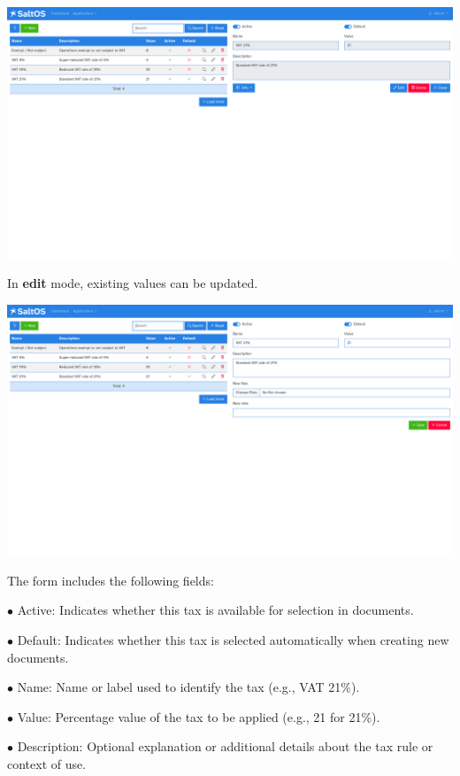 \documentclass[a4paper]{article}
\begin{document}
\begin{center}\includegraphics[width=1\textwidth]{../ujest/snaps/test-screenshots-js-screenshots-sales-taxes-view-1-en-us-1-snap.png}\end{center}

In \textbf{edit} mode, existing values can be updated.

\begin{center}\includegraphics[width=1\textwidth]{../ujest/snaps/test-screenshots-js-screenshots-sales-taxes-edit-1-en-us-1-snap.png}\end{center}

The form includes the following fields:

\begin{compactitem}
\item[\color{myblue}$\bullet$] Active: Indicates whether this tax is available for selection in documents.
\item[\color{myblue}$\bullet$] Default: Indicates whether this tax is selected automatically when creating new documents.
\item[\color{myblue}$\bullet$] Name: Name or label used to identify the tax (e.g., VAT 21\%).
\item[\color{myblue}$\bullet$] Value: Percentage value of the tax to be applied (e.g., 21 for 21\%).
\item[\color{myblue}$\bullet$] Description: Optional explanation or additional details about the tax rule or context of use.
\end{compactitem}
\end{document}
